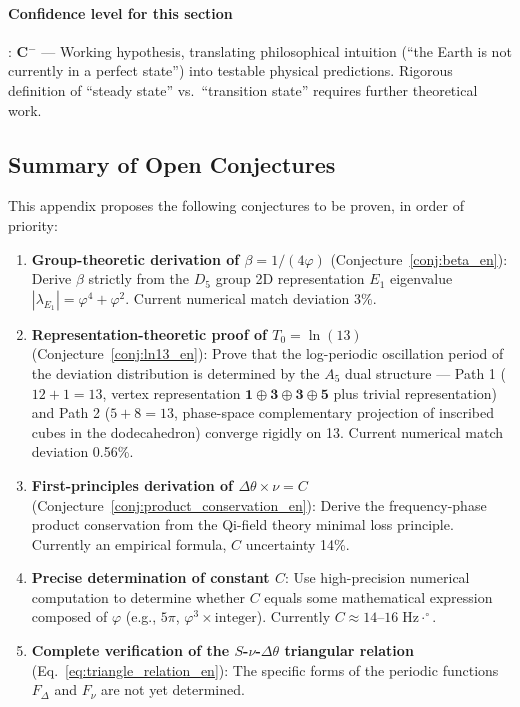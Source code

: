 \documentclass[12pt,a4paper,twocolumn]{article}
\renewcommand{\phi}{\varphi}
\begin{document}
\paragraph{Confidence level for this section}: \textbf{C$^-$} --- Working hypothesis, translating philosophical intuition (``the Earth is not currently in a perfect state'') into testable physical predictions. Rigorous definition of ``steady state'' vs.\ ``transition state'' requires further theoretical work.

\subsection{Summary of Open Conjectures}
\label{subsec:conjectures}

This appendix proposes the following conjectures to be proven, in order of priority:

\begin{enumerate}
\item \textbf{Group-theoretic derivation of $\beta = 1/(4\phi)$} (Conjecture~\ref{conj:beta_en}): Derive $\beta$ strictly from the $D_5$ group 2D representation $E_1$ eigenvalue $|\lambda_{E_1}| = \phi^4 + \phi^2$. Current numerical match deviation 3\%.

\item \textbf{Representation-theoretic proof of $T_0 = \ln(13)$} (Conjecture~\ref{conj:ln13_en}): Prove that the log-periodic oscillation period of the deviation distribution is determined by the $A_5$ dual structure --- Path 1 ($12+1=13$, vertex representation $\mathbf{1}\oplus\mathbf{3}\oplus\mathbf{3}\oplus\mathbf{5}$ plus trivial representation) and Path 2 ($5+8=13$, phase-space complementary projection of inscribed cubes in the dodecahedron) converge rigidly on 13. Current numerical match deviation 0.56\%.

\item \textbf{First-principles derivation of $\Delta\theta \times \nu = C$} (Conjecture~\ref{conj:product_conservation_en}): Derive the frequency-phase product conservation from the Qi-field theory minimal loss principle. Currently an empirical formula, $C$ uncertainty 14\%.

\item \textbf{Precise determination of constant $C$}: Use high-precision numerical computation to determine whether $C$ equals some mathematical expression composed of $\phi$ (e.g., $5\pi$, $\phi^3 \times \text{integer}$). Currently $C \approx 14$--$16\;\text{Hz}\cdot^\circ$.

\item \textbf{Complete verification of the $S$-$\nu$-$\Delta\theta$ triangular relation} (Eq.~\ref{eq:triangle_relation_en}): The specific forms of the periodic functions $F_\Delta$ and $F_\nu$ are not yet determined.
\end{enumerate}
\end{document}
